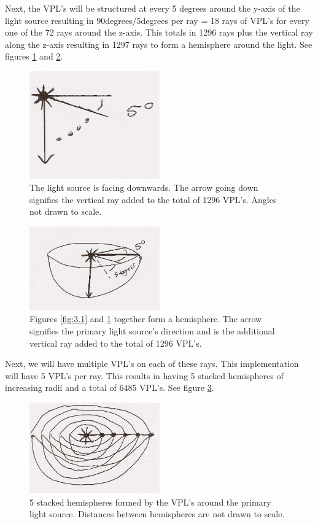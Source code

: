 Next, the VPL's will be structured at every 5 degrees around the y-axis of the light source resulting in 90degrees/5degrees per ray = 18 rays of VPL's for every one of the 72 rays around the z-axis.  This totals in 1296 rays plus the vertical ray along the z-axis resulting in 1297 rays to form a hemisphere around the light. See figures \ref{fig:3.2} and \ref{fig:3.3}.

\begin{figure}[h!]
  \centering
    \includegraphics[width=0.5\textwidth]{Figure32.jpg}
  \caption{The light source is facing downwards. The arrow going down signifies the vertical ray added to the total of 1296 VPL's. Angles not drawn to scale.}
	\label{fig:3.2}
\end{figure}


\begin{figure}[h!]
  \centering
    \includegraphics[width=0.5\textwidth]{Figure33.jpg}
  \caption{Figures \ref{fig:3.1} and \ref{fig:3.2} together form a hemisphere. The arrow signifies the primary light source's direction and is the additional vertical ray added to the total of 1296 VPL's.}
	\label{fig:3.3}
\end{figure}

Next, we will have multiple VPL's on each of these rays.  This implementation will have 5 VPL's per ray.  This results in having 5 stacked hemispheres of increasing radii and a total of 6485 VPL's. See figure \ref{fig:3.4}.

\begin{figure}[h!]
  \centering
    \includegraphics[width=0.5\textwidth]{Figure34.jpg}
  \caption{5 stacked hemispheres formed by the VPL's around the primary light source. Distances between hemispheres are not drawn to scale.}
	\label{fig:3.4}
\end{figure}

